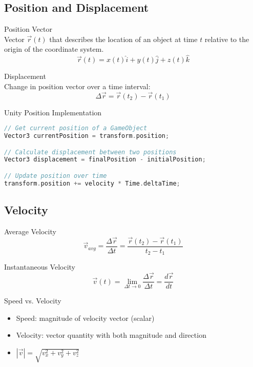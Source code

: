 \subsection{Position and Displacement}

\begin{definition}{Position Vector}\\
    Vector $\vec{r}(t)$ that describes the location of an object at time $t$ relative to the origin of the coordinate system.
    $$\vec{r}(t) = x(t)\hat{i} + y(t)\hat{j} + z(t)\hat{k}$$
\end{definition}

\begin{definition}{Displacement}\\
    Change in position vector over a time interval:
    $$\Delta\vec{r} = \vec{r}(t_2) - \vec{r}(t_1)$$
\end{definition}

\begin{code}{Unity Position Implementation}\\
\begin{lstlisting}[language=C, style=basesmol]
// Get current position of a GameObject
Vector3 currentPosition = transform.position;

// Calculate displacement between two positions
Vector3 displacement = finalPosition - initialPosition;

// Update position over time
transform.position += velocity * Time.deltaTime;
\end{lstlisting}
\end{code}

\subsection{Velocity}

\begin{definition}{Average Velocity}\\
    $$\vec{v}_{avg} = \frac{\Delta\vec{r}}{\Delta t} = \frac{\vec{r}(t_2) - \vec{r}(t_1)}{t_2 - t_1}$$
\end{definition}

\begin{definition}{Instantaneous Velocity}\\
    $$\vec{v}(t) = \lim_{\Delta t \to 0} \frac{\Delta\vec{r}}{\Delta t} = \frac{d\vec{r}}{dt}$$
\end{definition}

\begin{concept}{Speed vs. Velocity}\\
    \begin{itemize}
        \item Speed: magnitude of velocity vector (scalar)
        \item Velocity: vector quantity with both magnitude and direction
        \item $|\vec{v}| = \sqrt{v_x^2 + v_y^2 + v_z^2}$
    \end{itemize}
\end{concept}

